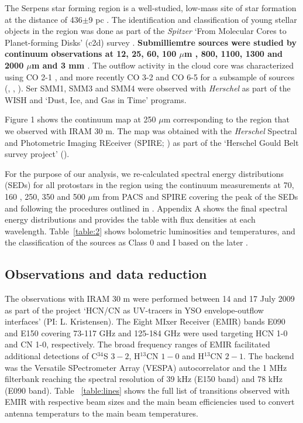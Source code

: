 \documentclass{aa}
\begin{document}
The Serpens star forming region is a well-studied, low-mass site of star formation at the 
distance of 436$\pm$9 pc \citep{Ort17}. The identification and classification of young 
stellar objects in the region was done as part of the \textit{Spitzer} ‘From Molecular Cores to
Planet-forming Disks’ (c2d) survey \citep{Har07,Eno09,Eva09,Dun15}. 
\textbf{Submilliemtre sources were studied by continuum observations at 12, 25, 60, 100 $\mu$m \citep{Hur96}, 800, 1100, 1300 and 2000 $\mu$m \citep{Cas93} and 3 mm \citep{Tes98}}. The outflow activity in the cloud core was characterized using CO 2-1 \citep{Dav99}, and 
more recently CO 3-2 and CO 6-5 for a subsample of sources (\textbf{\citealt{Gra10}}, \citealt{Dio10}, \citealt{Yil15}). Ser SMM1, SMM3 and 
SMM4 were observed with \textit{Herschel} as part of the WISH and `Dust, Ice, and Gas in Time' 
\citep[DIGIT,][]{Gre13,Gre16,YL18} programs. 

Figure 1 shows the continuum map at 250 $\mu$m corresponding to the region that we observed with 
IRAM 30 m. The map was obtained with the \textit{Herschel} Spectral and Photometric Imaging 
REceiver (SPIRE; \citealt{Gri10}) as part of the ‘Herschel Gould Belt survey project' (\citealt{And10}). 

For the purpose of our analysis, we re-calculated spectral energy distributions (SEDs) for 
all protostars in the region using the continuum measurements at 70, 160 , 250, 350 and 500 $\mu$m 
from PACS and SPIRE covering the peak of the SEDs and following the procedures outlined in \textbf{\citep{And10}}.
Appendix A shows the final spectral energy distributions and provides the table with
flux densities at each wavelength. Table~\ref{table:2} shows bolometric luminosities
and temperatures, and the classification of the sources as 
Class 0 and I based on the later \citep{Eva09}.

\subsection{Observations and data reduction}
 
The observations with IRAM 30 m were performed between 14 and 17 July 2009 as part of the project ‘HCN/CN as UV-tracers in YSO envelope-outflow interfaces’ (PI: L. Kristensen). The Eight MIxer Receiver (EMIR) bands E090 and E150 covering 73-117 GHz and 125-184 GHz were used targeting HCN 1-0 and CN 1-0, respectively. The broad frequency ranges of EMIR facilitated additional detections 
of C$^{34}$S $3-2$, H$^{13}$CN $1-0$ and H$^{13}$CN $2-1$. The
backend was the Versatile SPectrometer Array (VESPA) autocorrelator and the 1 MHz filterbank
reaching the spectral resolution of 39 kHz (E150 band) and 78 kHz (E090 band).
Table ~\ref{table:lines} shows the full list of transitions observed with EMIR with 
respective beam sizes and the main beam efficiencies used to convert antenna temperaturs 
to the main beam temperatures. 
\end{document}
